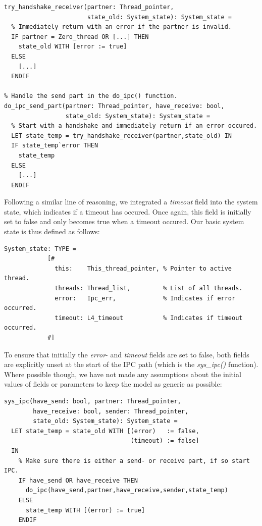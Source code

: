 \lstset{language=PVS}
\begin{lstlisting}[caption={PVS: example of error setting and checking.}]
% Try to have the sender and receiver agree upon engaging in IPC.
try_handshake_receiver(partner: Thread_pointer, 
                       state_old: System_state): System_state =
  % Immediately return with an error if the partner is invalid.
  IF partner = Zero_thread OR [...] THEN
    state_old WITH [error := true]
  ELSE
    [...]
  ENDIF

% Handle the send part in the do_ipc() function.
do_ipc_send_part(partner: Thread_pointer, have_receive: bool, 
                 state_old: System_state): System_state =
  % Start with a handshake and immediately return if an error occured.
  LET state_temp = try_handshake_receiver(partner,state_old) IN
  IF state_temp`error THEN
    state_temp   
  ELSE 
    [...]
  ENDIF
\end{lstlisting}

Following a similar line of reasoning, we integrated a \emph{timeout} field into the system state, which indicates if a timeout has occured. Once again, this field is initially set to false and only becomes true when a timeout occured. Our basic system state is thus defined as follows:

\lstset{language=PVS}
\begin{lstlisting}[caption={PVS: basic system state, with integrated \emph{timeout} field.}]
System_state: TYPE = 
            [# 
              this:    This_thread_pointer, % Pointer to active thread.
              threads: Thread_list,         % List of all threads.
              error:   Ipc_err,             % Indicates if error occurred.
              timeout: L4_timeout           % Indicates if timeout occurred.
            #]
\end{lstlisting}

To ensure that initially the \emph{error}- and \emph{timeout} fields are set to false, both fields are explicitly unset at the start of the IPC path (which is the \emph{sys\_ipc()} function). Where possible though, we have not made any assumptions about the initial values of fields or parameters to keep the model as generic as possible:

\lstset{language=PVS}
\begin{lstlisting}[caption={PVS: system state initialization in the \emph{sys\_ipc()} function.}]
sys_ipc(have_send: bool, partner: Thread_pointer,
        have_receive: bool, sender: Thread_pointer,
        state_old: System_state): System_state = 
  LET state_temp = state_old WITH [(error)   := false,
                                   (timeout) := false]
  IN
    % Make sure there is either a send- or receive part, if so start IPC.
    IF have_send OR have_receive THEN
      do_ipc(have_send,partner,have_receive,sender,state_temp)
    ELSE
      state_temp WITH [(error) := true]
    ENDIF
\end{lstlisting}

